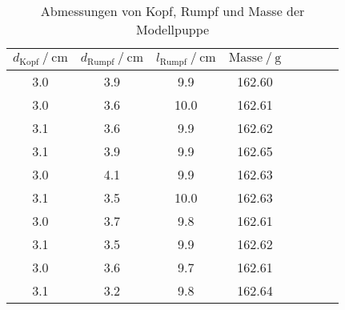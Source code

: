 \begin{table}
	\centering
	\caption{Abmessungen von Kopf, Rumpf und Masse der Modellpuppe}
	\label{tab:M5.2 Abmessungen Puppe}
	\begin{tabular}{S[table-format=1.1] S[table-format=1.1] S[table-format=2.1] S[table-format=2.1] S S S[table-format=2.1] S[table-format=2.1]}
	\toprule
{$d_{\mathup{Kopf}} \:/\: \si{\centi\meter}$} & {$d_{\mathup{Rumpf}} \:/\: \si{\centi\meter}$} & {$l_{\mathup{Rumpf}}\:/\: \si{\centi\meter}$} & {$\text{Masse}\:/\: \si{\gram}$} \\
	\midrule
3.0 &	3.9 	&  9.9	& 162.60  \\
3.0 &	3.6 	& 10.0	& 162.61  \\
3.1 &	3.6 	&  9.9	& 162.62  \\
3.1 &	3.9  	&  9.9	& 162.65  \\
3.0 &	4.1	&  9.9	& 162.63  \\
3.1 &	3.5	& 10.0	& 162.63  \\
3.0 &	3.7	&  9.8	& 162.61  \\
3.1 &	3.5	&  9.9	& 162.62  \\
3.0 &	3.6	&  9.7	& 162.61  \\
3.1 &	3.2	&  9.8	& 162.64  \\
\bottomrule
	\end{tabular}
\end{table}




